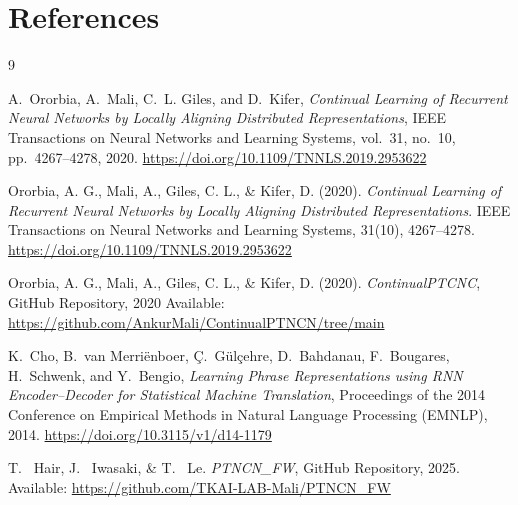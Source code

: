 \documentclass{article}
\begin{document}
\section{References}
\begin{thebibliography}{9}

A.~Ororbia, A.~Mali, C.~L. Giles, and D.~Kifer,
\textit{Continual Learning of Recurrent Neural Networks by Locally Aligning Distributed Representations},
IEEE Transactions on Neural Networks and Learning Systems, vol.~31, no.~10, pp.~4267--4278, 2020.
\url{https://doi.org/10.1109/TNNLS.2019.2953622}

Ororbia, A. G., Mali, A., Giles, C. L., \& Kifer, D. (2020).
\textit{Continual Learning of Recurrent Neural Networks by Locally Aligning Distributed Representations}.
IEEE Transactions on Neural Networks and Learning Systems, 31(10), 4267--4278.
\url{https://doi.org/10.1109/TNNLS.2019.2953622}

Ororbia, A. G., Mali, A., Giles, C. L., \& Kifer, D. (2020).
\textit{ContinualPTCNC}, GitHub Repository, 2020
Available: \url{https://github.com/AnkurMali/ContinualPTNCN/tree/main}

K.~Cho, B.~van Merriënboer, Ç.~Gülçehre, D.~Bahdanau, F.~Bougares, H.~Schwenk, and Y.~Bengio,
\textit{Learning Phrase Representations using RNN Encoder--Decoder for Statistical Machine Translation},
Proceedings of the 2014 Conference on Empirical Methods in Natural Language Processing (EMNLP), 2014.
\url{https://doi.org/10.3115/v1/d14-1179}

T. ~Hair, J. ~Iwasaki, \& T. ~Le.
\textit{PTNCN\_FW}, GitHub Repository, 2025.
Available: \url{https://github.com/TKAI-LAB-Mali/PTNCN_FW}

\end{thebibliography}
\end{document}
